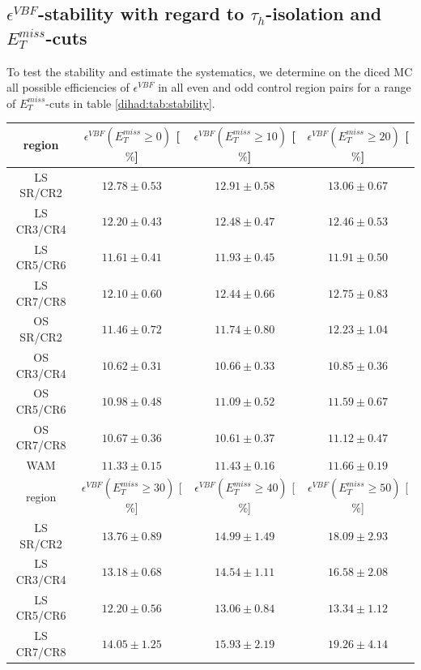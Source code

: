 \subsection{$\epsilon^{VBF}$-stability with regard to $\tau_{h}$-isolation and $E_{T}^{miss}$-cuts}\label{dihad:subsec:stability}
To test the stability and estimate the systematics, we determine on the diced MC all possible efficiencies of $\epsilon^{VBF}$ in all even and odd control region pairs for a range of $E_{T}^{miss}$-cuts in table \ref{dihad:tab:stability}.
\begin{table}[!h]
	\centering
	\begin{tabular}{|c||c|c|c|}
		\hline
		region     & $\epsilon^{VBF}(E_{T}^{miss}\geq0)$ [$\%$]& $\epsilon^{VBF}(E_{T}^{miss}\geq10)$ [$\%$]& $\epsilon^{VBF}(E_{T}^{miss}\geq20)$ [$\%$]\\ \hline \hline
		LS SR/CR2  & $12.78\pm0.53$ & $12.91\pm0.58$ & $13.06\pm0.67$ \\ \hline
		LS CR3/CR4 & $12.20\pm0.43$ & $12.48\pm0.47$ & $12.46\pm0.53$ \\ \hline
		LS CR5/CR6 & $11.61\pm0.41$ & $11.93\pm0.45$ & $11.91\pm0.50$ \\ \hline
		LS CR7/CR8 & $12.10\pm0.60$ & $12.44\pm0.66$ & $12.75\pm0.83$ \\ \hline \hline
		OS SR/CR2  & $11.46\pm0.72$ & $11.74\pm0.80$ & $12.23\pm1.04$ \\ \hline
		OS CR3/CR4 & $10.62\pm0.31$ & $10.66\pm0.33$ & $10.85\pm0.36$ \\ \hline
		OS CR5/CR6 & $10.98\pm0.48$ & $11.09\pm0.52$ & $11.59\pm0.67$ \\ \hline
		OS CR7/CR8 & $10.67\pm0.36$ & $10.61\pm0.37$ & $11.12\pm0.47$ \\ \hline \hline
		WAM        & $11.33\pm0.15$ & $11.43\pm0.16$ & $11.66\pm0.19$ \\ \hline
		\hline
		\hline
		region     & $\epsilon^{VBF}(E_{T}^{miss}\geq30)$ [$\%$]& $\epsilon^{VBF}(E_{T}^{miss}\geq40)$ [$\%$]& $\epsilon^{VBF}(E_{T}^{miss}\geq50)$ [$\%$]\\ \hline \hline
		LS SR/CR2  & $13.76\pm0.89$ & $14.99\pm1.49$ & $18.09\pm2.93$ \\ \hline
		LS CR3/CR4 & $13.18\pm0.68$ & $14.54\pm1.11$ & $16.58\pm2.08$ \\ \hline
		LS CR5/CR6 & $12.20\pm0.56$ & $13.06\pm0.84$ & $13.34\pm1.12$ \\ \hline
		LS CR7/CR8 & $14.05\pm1.25$ & $15.93\pm2.19$ & $19.26\pm4.14$ \\ \hline \hline

\end{tabular}
\end{table}
